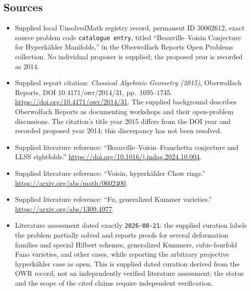 \documentclass[11pt]{article}
\begin{document}
\subsection{Sources}
\begin{itemize}
\item Supplied local UnsolvedMath registry record, permanent ID \(30002612\), exact source problem code \texttt{catalogue entry}, titled ``Beauville--Voisin Conjecture for Hyperkähler Manifolds,'' in the Oberwolfach Reports Open Problems collection. No individual proposer is supplied; the proposed year is recorded as 2014.
\item Supplied report citation: \emph{Classical Algebraic Geometry (2015)}, Oberwolfach Reports, DOI 10.4171/owr/2014/31, pp.\ 1695--1745. \url{https://doi.org/10.4171/owr/2014/31}. The supplied background describes Oberwolfach Reports as documenting workshops and their open-problem discussions. The citation's title year 2015 differs from the DOI year and recorded proposed year 2014; this discrepancy has not been resolved.
\item Supplied literature reference: ``Beauville--Voisin--Franchetta conjecture and LLSS eightfolds.'' \url{https://doi.org/10.1016/j.indag.2024.10.004}.
\item Supplied literature reference: ``Voisin, hyperkähler Chow rings.'' \url{https://arxiv.org/abs/math/0602400}.
\item Supplied literature reference: ``Fu, generalized Kummer varieties.'' \url{https://arxiv.org/abs/1309.4977}.
\item Literature assessment dated exactly \texttt{2026-08-21}: the supplied curation labels the problem partially solved and reports proofs for several deformation families and special Hilbert schemes, generalized Kummers, cubic-fourfold Fano varieties, and other cases, while reporting the arbitrary projective hyperkähler case as open. This is supplied dated curation derived from the OWR record, not an independently verified literature assessment; the status and the scope of the cited claims require independent verification.
\end{itemize}
\end{document}

